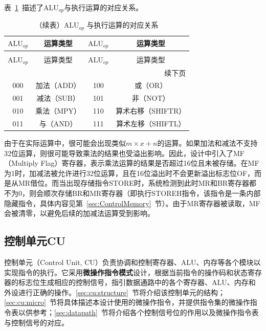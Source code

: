 \documentclass[lang=cn,a4paper,newtx]{elegantpaper}
\begin{document}
表~\ref{tab:aluop}~描述了$\text{ALU}_{op}$与执行运算的对应关系。
\begin{longtable}{c c @{\hskip 2cm} c c}
  \caption{$\text{ALU}_{op}$ 与执行运算的对应关系} \label{tab:aluop} \\
  \toprule
  $\text{ALU}_{op}$ & 运算类型 & $\text{ALU}_{op}$ & 运算类型 \\
  \midrule
  \endfirsthead

  \caption[]{（续表）$\text{ALU}_{op}$ 与执行运算的对应关系} \\
  \toprule
  $\text{ALU}_{op}$ & 运算类型 & $\text{ALU}_{op}$ & 运算类型 \\
  \midrule
  \endhead

  \midrule
  \multicolumn{4}{r}{续下页} \\
  \midrule
  \endfoot

  \bottomrule
  \endlastfoot

  000 & 加法（ADD）       & 100 & 或（OR）         \\
  001 & 减法（SUB）       & 101 & 非（NOT）        \\
  010 & 乘法（MPY）       & 110 & 算术右移（SHIFTR）   \\
  011 & 与（AND）         & 111 & 算术左移（SHIFTL）   \\

\end{longtable}

由于在实际运算中，很可能会出现类似$m\times x +n$的运算。如果加法和减法不支持32位运算，则很可能导致乘法的结果也受溢出影响。因此，设计中引入了MF（Multiply Flag）寄存器，表示乘法运算的结果是否超过16位且未被存储。在MF为1时，加减法被允许进行32位运算，且在16位溢出时不会更新溢出标志位OF，而是从MR借位。而当出现存储指令STORE时，系统检测到此时MR和BR寄存器都不为0，则会顺次存储BR和MR寄存器（即执行STOREH指令，该指令是一条内部隐藏指令，具体内容见第~\ref{sec:ControlMemory}~节）。由于MR寄存器被读取，MF会被清零，以避免后续的加减法运算受到影响。

\subsection{控制单元CU}
控制单元（Control Unit, CU）负责协调和控制寄存器、ALU、内存等各个模块以实现指令的执行。它采用\textbf{微操作指令模式}设计，根据当前指令的操作码和状态寄存器的标志位生成相应的控制信号，指引数据通路中的各个寄存器、ALU、内存和外设进行正确的操作。\ref{sec:cu:structure}~节将介绍该控制单元的结构；\ref{sec:cu:micro}~节将具体描述本设计使用的微操作指令，并提供指令集的微操作指令表以供参考；\ref{sec:datapath}~节将介绍各个控制信号位的作用以及微操作指令表与控制信号的对应。
\end{document}
